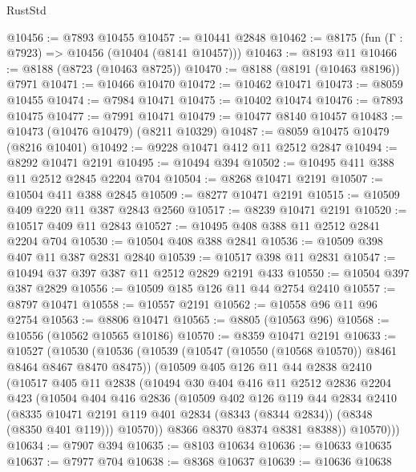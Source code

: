 \begin{lexlean}{RustStd}
\begin{coremodule}
{\begin{coremodule}
{{{{{{{{{{{{{{{{{{{{{{{{{{{{{{{{{{{{{{{{{{{{{{{{{{@10456 := @7893 @10455
@10457 := @10441 @2848
@10462 := @8175 (fun (Γ : @7923) => @10456 (@10404 (@8141 @10457)))
@10463 := @8193 @11
@10466 := @8188 (@8723 (@10463 @8725))
@10470 := @8188 (@8191 (@10463 @8196)) @7971
@10471 := @10466 @10470
@10472 := @10462 @10471
@10473 := @8059 @10455
@10474 := @7984 @10471
@10475 := @10402 @10474
@10476 := @7893 @10475
@10477 := @7991 @10471
@10479 := @10477 @8140 @10457
@10483 := @10473 (@10476 @10479) (@8211 @10329)
@10487 := @8059 @10475 @10479 (@8216 @10401)
@10492 := @9228 @10471 @412 @11 @2512 @2847
@10494 := @8292 @10471 @2191
@10495 := @10494 @394
@10502 := @10495 @411 @388 @11 @2512 @2845 @2204 @704
@10504 := @8268 @10471 @2191
@10507 := @10504 @411 @388 @2845
@10509 := @8277 @10471 @2191
@10515 := @10509 @409 @220 @11 @387 @2843 @2560
@10517 := @8239 @10471 @2191
@10520 := @10517 @409 @11 @2843
@10527 := @10495 @408 @388 @11 @2512 @2841 @2204 @704
@10530 := @10504 @408 @388 @2841
@10536 := @10509 @398 @407 @11 @387 @2831 @2840
@10539 := @10517 @398 @11 @2831
@10547 := @10494 @37 @397 @387 @11 @2512 @2829 @2191 @433
@10550 := @10504 @397 @387 @2829
@10556 := @10509 @185 @126 @11 @44 @2754 @2410
@10557 := @8797 @10471
@10558 := @10557 @2191
@10562 := @10558 @96 @11 @96 @2754
@10563 := @8806 @10471
@10565 := @8805 (@10563 @96)
@10568 := @10556 (@10562 @10565 @10186)
@10570 := @8359 @10471 @2191
@10633 := @10527
    (@10530
      (@10536
        (@10539 (@10547 (@10550 (@10568 @10570)) @8461 @8464 @8467 @8470 @8475))
        (@10509
          @405
          @126
          @11
          @44
          @2838
          @2410
          (@10517
            @405
            @11
            @2838
            (@10494
              @30
              @404
              @416
              @11
              @2512
              @2836
              @2204
              @423
              (@10504
                @404
                @416
                @2836
                (@10509
                  @402
                  @126
                  @119
                  @44
                  @2834
                  @2410
                  (@8335
                    @10471
                    @2191
                    @119
                    @401
                    @2834
                    (@8343 (@8344 @2834))
                    (@8348 (@8350 @401 @119)))
                  @10570))
              @8366
              @8370
              @8374
              @8381
              @8388))
          @10570)))
@10634 := @7907 @394
@10635 := @8103 @10634
@10636 := @10633 @10635
@10637 := @7977 @704
@10638 := @8368 @10637
@10639 := @10636 @10638
}}}}}}}}}}}}}}}}}}}}}}}}}}}}}}}}}}}}}}}}}}}}}}}}}}
\end{coremodule}}
\end{coremodule}
\end{lexlean}
